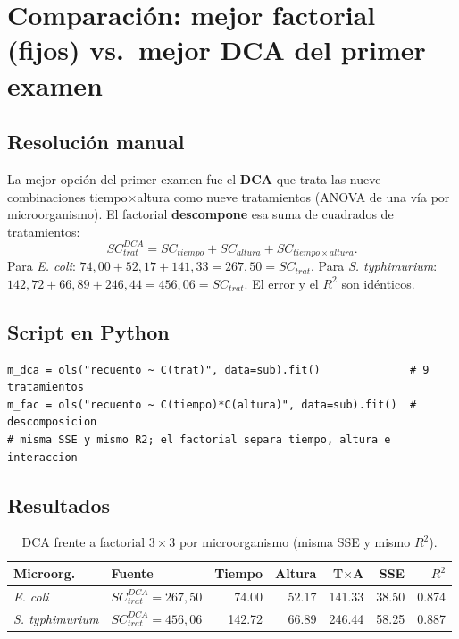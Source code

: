 \documentclass[12pt,a4paper]{article}
\begin{document}
\section{Comparación: mejor factorial (fijos) vs.\ mejor DCA del primer examen}
\label{sec:factorial-vs-dca}

\subsection{Resolución manual}

La mejor opción del primer examen fue el \textbf{DCA} que trata las nueve combinaciones tiempo$\times$altura como nueve tratamientos (ANOVA de una vía por microorganismo). El factorial \textbf{descompone} esa suma de cuadrados de tratamientos:
\[
SC_{trat}^{DCA}=SC_{tiempo}+SC_{altura}+SC_{tiempo\times altura}.
\]
Para \textit{E. coli}: $74{,}00+52{,}17+141{,}33=267{,}50=SC_{trat}$. Para \textit{S. typhimurium}: $142{,}72+66{,}89+246{,}44=456{,}06=SC_{trat}$. El error y el $R^2$ son idénticos.

\subsection{Script en Python}

\begin{lstlisting}[caption={DCA (una vía) frente al factorial 3x3, por microorganismo.}]
m_dca = ols("recuento ~ C(trat)", data=sub).fit()              # 9 tratamientos
m_fac = ols("recuento ~ C(tiempo)*C(altura)", data=sub).fit()  # descomposicion
# misma SSE y mismo R2; el factorial separa tiempo, altura e interaccion
\end{lstlisting}

\subsection{Resultados}

\begin{table}[H]
\centering
\caption{DCA frente a factorial $3\times3$ por microorganismo (misma SSE y mismo $R^2$).}
\begin{tabular}{llrrrrr}
\toprule
\textbf{Microorg.} & \textbf{Fuente} & \textbf{Tiempo} & \textbf{Altura} & \textbf{T$\times$A} & \textbf{SSE} & \textbf{$R^2$}\\
\midrule
\textit{E. coli} & $SC_{trat}^{DCA}=267{,}50$ & 74.00 & 52.17 & 141.33 & 38.50 & 0.874\\
\textit{S. typhimurium} & $SC_{trat}^{DCA}=456{,}06$ & 142.72 & 66.89 & 246.44 & 58.25 & 0.887\\
\bottomrule
\end{tabular}
\end{table}
\end{document}
